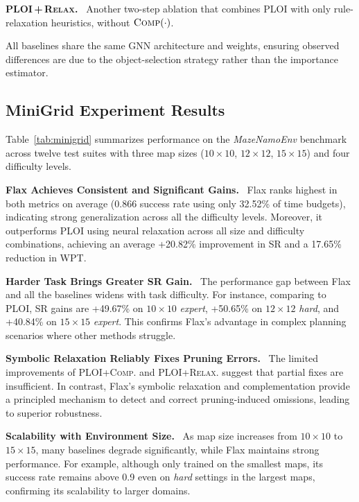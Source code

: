 \documentclass[letterpaper, 10pt, journal, twoside]{IEEEtran}
\newcommand{\tref}[1]{Table~\ref{#1}}
\newcommand{\myparagraph}[1]{\noindent\textbf{#1}~}
\newcommand{\shortname}{Flax\xspace}
\begin{document}
\myparagraph{\textsc{PLOI}\,+\,\textsc{Relax.}}\;
Another two-step ablation that combines PLOI with only rule-relaxation heuristics, without $\textsc{Comp}(\cdot)$.

All baselines share the same GNN architecture and weights, ensuring observed differences are due to the object-selection strategy rather than the importance estimator.


\subsection{MiniGrid Experiment Results}\label{sec:sim-results}
\tref{tab:minigrid} summarizes performance on the \textit{MazeNamoEnv} benchmark across twelve test suites with three map sizes ($10\!\times\!10$, $12\!\times\!12$, $15\!\times\!15$) and four difficulty levels.

\myparagraph{\shortname Achieves Consistent and Significant Gains.}
\shortname ranks highest in both metrics on average (0.866 success rate using only 32.52\% of time budgets), indicating strong generalization across all the difficulty levels. Moreover, it outperforms PLOI using neural relaxation across all size and difficulty combinations, achieving an average +20.82\% improvement in SR and a 17.65\% reduction in WPT. 

\myparagraph{Harder Task Brings Greater SR Gain.}
The performance gap between \shortname and all the baselines widens with task difficulty. For instance, comparing to PLOI, SR gains are +49.67\% on $10\!\times\!10$ \emph{expert}, +50.65\% on $12\!\times\!12$ \emph{hard}, and +40.84\% on $15\!\times\!15$ \emph{expert}. This confirms \shortname's advantage in complex planning scenarios where other methods struggle.

\myparagraph{Symbolic Relaxation Reliably Fixes Pruning Errors.}
The limited improvements of \textsc{PLOI+Comp.} and \textsc{PLOI+Relax.} suggest that partial fixes are insufficient. In contrast, \shortname's symbolic relaxation and complementation provide a principled mechanism to detect and correct pruning-induced omissions, leading to superior robustness.

\myparagraph{Scalability with Environment Size.}
As map size increases from $10\!\times\!10$ to $15\!\times\!15$, many baselines degrade significantly, while \shortname maintains strong performance. For example, although only trained on the smallest maps, its success rate remains above 0.9 even on \emph{hard} settings in the largest maps, confirming its scalability to larger domains.
\end{document}

